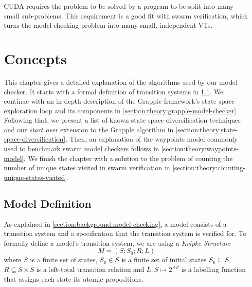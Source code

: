 \documentclass[
fancyheadings, %
%
%
]{stsreprt}
\begin{document}
CUDA requires the problem to be solved by a program to be split into many small sub-problems.
This requirement is a good fit with swarm verification, which turns the model checking problem into many small, independent VTs.



\chapter{Concepts}
\label{chapter:theory}

This chapter gives a detailed explanation of the algorithms used by our model checker.
It starts with a formal definition of transition systems in \cref{section:theory:model-definition}.
We continue with an in-depth description of the Grapple framework's state space exploration loop and its components in \cref{section:theory:grapple-model-checker}
Following that, we present a list of known state space diversification techniques and our \emph{start over} extension to the Grapple algorithm in \cref{section:theory:state-space-diversification}.
Then, an explanation of the waypoints model commonly used to benchmark swarm model checkers follows in \cref{section:theory:waypoints-model}.
We finish the chapter with a solution to the problem of counting the number of unique states visited in swarm verification in \cref{section:theory:counting-unique-states-visited}.


\section{Model Definition}
\label{section:theory:model-definition}

As explained in \cref{section:background:model-checking}, a model consists of a transition system and a specification that the transition system is verified for.
To formally define a model's transition system, we are using a \emph{Kripke Structure} \[M = \left(S; S_0; R; L \right)\] where $S$ is a finite set of states, $S_0 \in S$ is a finite set of initial states $S_0 \subseteq S$, $R \subseteq S \times S$ is a left-total transition relation and $L : S \mapsto 2^{AP}$ is a labelling function that assigns each state its atomic propositions.
\end{document}
